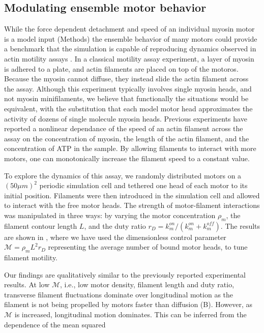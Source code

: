 \documentclass[12pt]{article}
\begin{document}
\subsection{Modulating ensemble motor behavior}
While the force dependent detachment and speed of an individual myosin motor is
a model input (Methods) the ensemble behavior of many motors could provide
a benchmark that the simulation is capable of reproducing dynamics observed in 
actin motility assays \cite{riveline1998, walcott2012}. In a classical motility
assay experiment, a layer of myosin is adhered to a plate, and actin filaments
are placed on top of the motoros. Because the myosin cannot diffuse, they
instead slide the actin filament across the assay. Although this experiment
typically involves single myosin heads, and not myosin minifilaments, we believe
that functionally the situations would be equivalent, with the substitution that
each model motor head approximates the activity of dozens of single molecule
myosin heads. Previous experiments \cite{harris1993, umemoto1990} have reported
a nonlinear dependance of the speed of an actin filament across the assay on the
concentration of myosin, the length of the actin filament, and the concentration
of ATP in the sample. By allowing filaments to interact with more motors, one
can monotonically increase the filament speed to a constant value.
\par
To explore the dynamics of this assay, we randomly distributed motors on a
$(50\mu m)^2$ periodic simulation cell and tethered one head of each motor to
its initial position. Filaments were then introduced in the simulation cell and 
allowed to interact with the free motor heads. The strength of motor-filament
interactions was manipulated in three ways: by varying the motor concentration
$\rho_m$, the filament contour length $L$, and the duty ratio $r_D =k_m^{on}/(k_m^{on}+k_m^{off})$. 
The results are shown in , where we have used the
dimensionless control parameter $\mathcal{M} = \rho_m L^2 r_D$ representing the
average number of bound motor heads, to tune filament motility.
\par
Our findings are qualitatively similar to the previously reported experimental 
results. At low $\mathcal{M}$, i.e., low motor density, filament length and duty
ratio, transverse filament fluctuations dominate over longitudinal motion as
the filament is not being propelled by motors faster than diffusion
(B). However, as $\mathcal{M}$ is increased, longitudinal
motion dominates. This can be inferred from the dependence of the mean squared
\end{document}
